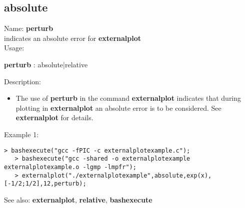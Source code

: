 \subsection{ absolute }
\noindent Name: \textbf{perturb}\\
indicates an absolute error for \textbf{externalplot}\\

\noindent Usage: 
\begin{center}
\textbf{perturb} : \textsf{absolute|relative}\\
\end{center}
\noindent Description: \begin{itemize}

\item The use of \textbf{perturb} in the command \textbf{externalplot} indicates that during
   plotting in \textbf{externalplot} an absolute error is to be considered.
   See \textbf{externalplot} for details.
\end{itemize}
\noindent Example 1: 
\begin{center}\begin{minipage}{14.8cm}\begin{Verbatim}[frame=single]
   > bashexecute("gcc -fPIC -c externalplotexample.c");
   > bashexecute("gcc -shared -o externalplotexample externalplotexample.o -lgmp -lmpfr");
   > externalplot("./externalplotexample",absolute,exp(x),[-1/2;1/2],12,perturb);
\end{Verbatim}
\end{minipage}\end{center}
See also: \textbf{externalplot}, \textbf{relative}, \textbf{bashexecute}
